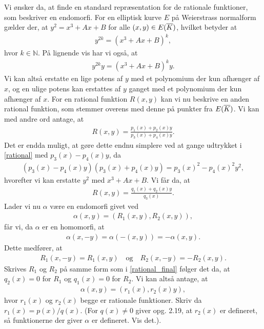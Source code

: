 Vi ønsker da, at finde en standard repræsentation for de rationale funktioner, som
beskriver en endomorfi. For en elliptisk kurve $E$ på Weierstrass normalform gælder
der, at $y^2 = x^3 + Ax + B$ for alle $(x, y) \in E(\overline{K})$, hvilket betyder at
\begin{align*}
	y^{2k} = (x^3 + Ax + B)^k,
\end{align*}
hvor $k \in \mathbb{N}$. På lignende vis har vi også, at 
\begin{align*}
	y^{2k} y = (x^3 + Ax + B)^k y.
\end{align*}
Vi kan altså erstatte en lige potens af $y$ med et polynomium der kun afhænger af $x$, og en ulige potens kan erstattes af $y$ ganget med et polynomium der kun afhænger af $x$.
For en rational funktion $R(x, y)$ kan vi nu beskrive en anden rational funktion,
som stemmer overens med denne på punkter fra $E(\overline{K})$. Vi kan med andre ord antage,
at 
\begin{align}
	\label{rational}
	R(x, y) = \frac{p_1(x) + p_2(x)y}{p_3(x)+p_4(x)y}.
\end{align}
Det er endda muligt, at gøre dette endnu simplere ved at gange udtrykket i \eqref{rational}
med $p_3(x)-p_4(x)y$, da 
\begin{align*}
	(p_3(x) - p_4(x)y)(p_3(x)+p_4(x)y) = p_3(x)^2 - p_4(x)^2 y^2,
\end{align*}
hvorefter vi kan erstatte $y^2$ med $x^3+Ax+B$. Vi får da, at 
\begin{align}
	\label{rational_final}
	R(x, y) = \frac{q_1(x) + q_2(x)y}{q_3(x)}.
\end{align}
Lader vi nu $\alpha$ være en endomorfi givet ved
\begin{align*}
	\alpha(x, y) = (R_1(x, y), R_2(x, y)),
\end{align*}
får vi, da $\alpha$ er en homomorfi, at 
\begin{align*}
	\alpha(x, -y) = \alpha(-(x, y)) =  -\alpha(x, y).
\end{align*}
Dette medfører, at 
\begin{align*}
	R_1(x, -y) = R_1(x, y) \quad \text{og} \quad R_2(x, -y) = -R_2(x, y).
\end{align*}
Skrives $R_1$ og $R_2$ på samme form som i \eqref{rational_final} følger det da, at 
$q_2(x)=0$ for $R_1$ og $q_1(x)=0$ for $R_2$. Vi kan altså antage, at 
\begin{align*}
		\alpha(x, y) = (r_1(x), r_2(x)y),
\end{align*}
hvor $r_1(x)$ og $r_2(x)$ begge er rationale funktioner. Skriv da $r_1(x)=p(x)/q(x)$. (For $q(x) \neq 0$ giver opg. 2.19, at $r_2(x)$ er defineret, så funktionerne der giver $\alpha$ er defineret. Vis det.).

